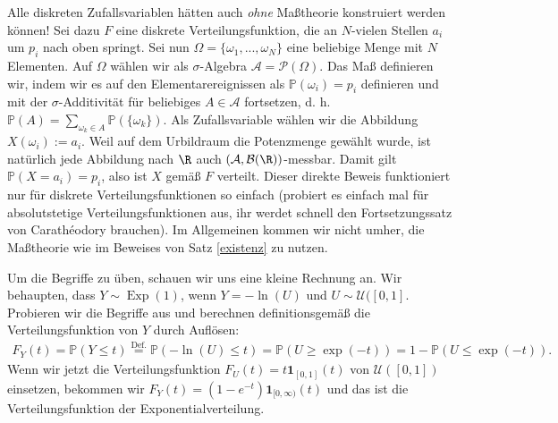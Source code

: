 \begin{bem}
	Alle diskreten Zufallsvariablen hätten auch \textit{ohne} Maßtheorie konstruiert werden können! Sei dazu $F$ eine diskrete Verteilungsfunktion, die an $N$-vielen Stellen $a_i$ um $p_i$ nach oben springt. Sei nun $\Omega=\{\omega_1,...,\omega_N\}$ eine beliebige Menge mit $N$ Elementen. Auf $\Omega$ w\"ahlen wir als $\sigma$-Algebra $\mathcal A=\mathcal P(\Omega)$. Das Ma\ss{} definieren wir, indem wir es auf den Elementarereignissen als $\mathbb P(\omega_i)=p_i$ definieren und mit der $\sigma$-Additivit\"at f\"ur beliebiges $A\in \mathcal A$ fortsetzen, d. h. $\mathbb P(A)=\sum_{\omega_k\in A} \mathbb P(\{\omega_k\}).$ Als Zufallsvariable w\"ahlen wir die Abbildung $X(\omega_i):=a_i$. Weil auf dem Urbildraum die Potenzmenge gew\"ahlt wurde, ist nat\"urlich jede Abbildung nach $\R$ auch $(\mathcal A, \mathcal B(\R))$-messbar. Damit gilt $\mathbb{P}(X = a_i ) = p_i$, also ist $X$ gem\"a\ss{} $F$ verteilt. Dieser direkte Beweis funktioniert nur f\"ur diskrete Verteilungsfunktionen so einfach (probiert es einfach mal f\"ur absolutstetige Verteilungsfunktionen aus, ihr werdet schnell den Fortsetzungssatz von Carath\'eodory brauchen). Im Allgemeinen kommen wir nicht umher, die Ma\ss theorie wie im Beweises von Satz \ref{existenz} zu nutzen.
\end{bem}

Um die Begriffe zu \"uben, schauen wir uns eine kleine Rechnung an. Wir behaupten, dass $Y\sim \operatorname{Exp}(1)$, wenn $Y=-\ln(U)$ und $U\sim \mathcal U([0,1]$. Probieren wir die Begriffe aus und berechnen definitionsgem\"a\ss{} die Verteilungsfunktion von $Y$ durch Aufl\"osen:
\begin{align*}
	F_Y(t)=\mathbb P(Y\leq t) \overset{\text{Def.}}{=} \mathbb P(-\ln(U)\leq t)=\mathbb P(U\geq \exp(-t))=1-\mathbb P(U\leq \exp(-t)).
\end{align*}
Wenn wir jetzt die Verteilungsfunktion $F_U(t)= t \mathbf 1_{[0,1]}(t)$ von $\mathcal U([0,1])$ einsetzen, bekommen wir $F_Y(t)= (1-e^{-t})\mathbf 1_{[0,\infty)}(t)$ und das ist die Verteilungsfunktion der Exponentialverteilung.


